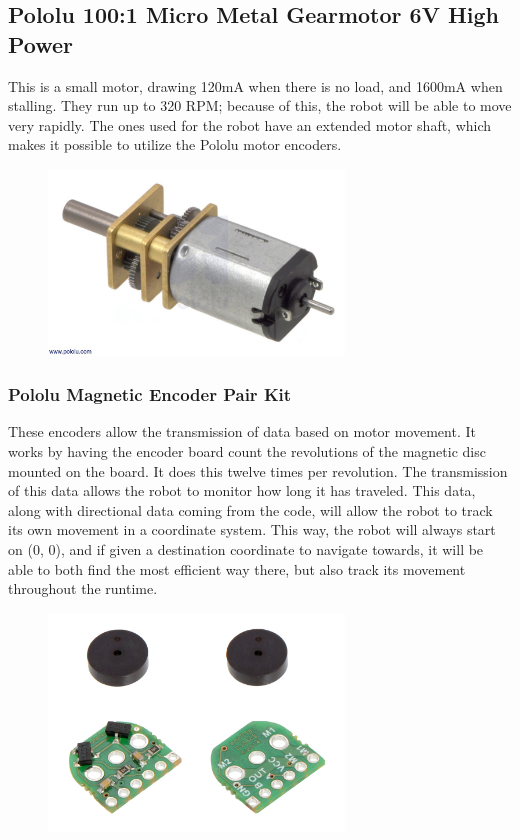 \subsection{Pololu 100:1 Micro Metal Gearmotor 6V High Power}

This is a small motor, drawing 120mA when there is no load, and 1600mA when stalling. They run up to 320 RPM; because of this, the robot will be able to move very rapidly. The ones used for the robot have an extended motor shaft, which makes it possible to utilize the Pololu motor encoders.

\begin{figure}[!ht]
	\centering
	\includegraphics[width=0.7\textwidth]{figures/pololu.jpg}
	\caption{}
	\label{Hardware diagram}
\end{figure}

\subsubsection{Pololu Magnetic Encoder Pair Kit}

These encoders allow the transmission of data based on motor movement. It works by having the encoder board count the revolutions of the magnetic disc mounted on the board. It does this twelve times per revolution. The transmission of this data allows the robot to monitor how long it has traveled. This data, along with directional data coming from the code, will allow the robot to track its own movement in a coordinate system. This way, the robot will always start on (0, 0), and if given a destination coordinate to navigate towards, it will be able to both find the most efficient way there, but also track its movement throughout the runtime.

\begin{figure}[!ht]
	\centering
	\includegraphics[width=0.7\textwidth]{figures/pololuEncoder.jpg}
	\caption{}
	\label{Hardware diagram}
\end{figure}

